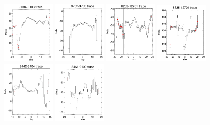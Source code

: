 \documentclass[fleqn,usenatbib]{mnras}
\begin{document}
\begin{figure}
    \centering
    \includegraphics[width=0.23\textwidth]{Images/SN1-MC250/CPSB-CTRLs/8084-6103-1-250.png}
    \includegraphics[width=0.23\textwidth]{Images/SN1-MC250/CPSB-CTRLs/8262-3703-1-250.png}
    \includegraphics[width=0.23\textwidth]{Images/SN1-MC250/CPSB-CTRLs/8262-12701-1-250.png}
    \includegraphics[width=0.23\textwidth]{Images/SN1-MC250/CPSB-CTRLs/8335-12704-1-250.png}
    \includegraphics[width=0.23\textwidth]{Images/SN1-MC250/CPSB-CTRLs/8442-3704-1-250.png}
    \includegraphics[width=0.23\textwidth]{Images/SN1-MC250/CPSB-CTRLs/8461-9102-1-250.png}

\end{figure}
\end{document}
